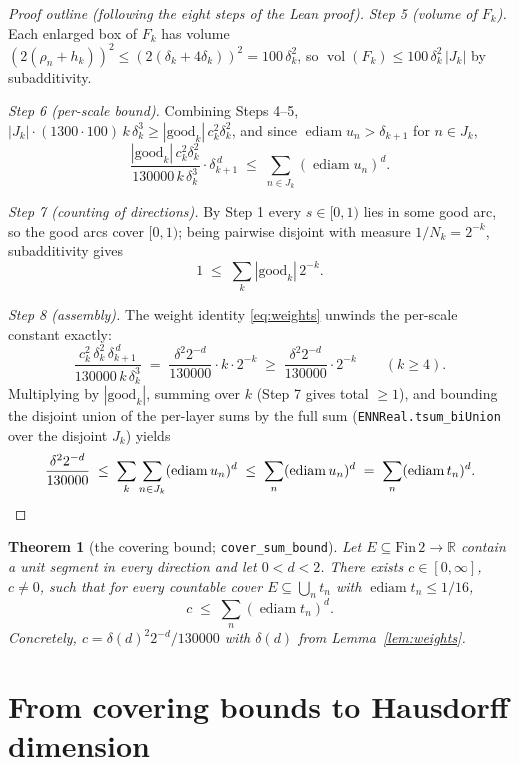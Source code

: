 \documentclass[11pt,a4paper]{article}
\newcommand{\R}{\mathbb{R}}
\newcommand{\ennr}{\ensuremath{[0,\infty]}}          %
\newcommand{\vol}{\operatorname{vol}}                %
\DeclareMathOperator{\ediam}{ediam}
\newcommand{\FinTwo}{\ensuremath{\mathrm{Fin}\,2 \to \R}}
\newcommand{\lname}[1]{\texttt{#1}}                  %
\newtheorem{theorem}{Theorem}[section]
\theoremstyle{definition}
\theoremstyle{remark}
\begin{document}
\begin{proof}[Proof outline (following the eight steps of the Lean proof)]
\medskip\noindent\emph{Step 5 (volume of $F_k$).}
Each enlarged box of $F_k$ has volume $(2(\rho_n+h_k))^2\le (2(\delta_k+4\delta_k))^2
=100\,\delta_k^2$, so
$\vol(F_k)\le 100\,\delta_k^2\,|J_k|$ by subadditivity.

\medskip\noindent\emph{Step 6 (per-scale bound).}
Combining Steps 4--5, $|J_k|\cdot (1300\cdot 100)\,k\,\delta_k^{3}\ge
|\mathrm{good}_k|\,c_k^{2}\delta_k^{2}$, and since
$\ediam u_n > \delta_{k+1}$ for $n\in J_k$,
\[
  \frac{|\mathrm{good}_k|\,c_k^{2}\delta_k^{2}}{130000\,k\,\delta_k^{3}}\cdot
  \delta_{k+1}^{\,d}
  \;\le\; \sum_{n\in J_k} (\ediam u_n)^{d} .
\]

\medskip\noindent\emph{Step 7 (counting of directions).}
By Step 1 every $s\in[0,1)$ lies in some good arc, so the good arcs cover $[0,1)$;
being pairwise disjoint with measure $1/N_k = 2^{-k}$, subadditivity gives
\[
  1\;\le\;\sum_k |\mathrm{good}_k|\,2^{-k}.
\]

\medskip\noindent\emph{Step 8 (assembly).}
The weight identity \eqref{eq:weights} unwinds the per-scale constant exactly:
\[
  \frac{c_k^{2}\,\delta_k^{2}\,\delta_{k+1}^{\,d}}{130000\,k\,\delta_k^{3}}
  \;=\; \frac{\delta^{2}2^{-d}}{130000}\cdot k\cdot 2^{-k}
  \;\ge\; \frac{\delta^{2}2^{-d}}{130000}\cdot 2^{-k} \qquad(k\ge4).
\]
Multiplying by $|\mathrm{good}_k|$, summing over $k$ (Step 7 gives total $\ge1$), and
bounding the disjoint union of the per-layer sums by the full sum
(\lname{ENNReal.tsum\_biUnion} over the disjoint $J_k$) yields
\[
  \frac{\delta^{2}2^{-d}}{130000}
  \;\le\; \sum_k\sum_{n\in J_k}(\ediam u_n)^{d}
  \;\le\; \sum_n (\ediam u_n)^{d}
  \;=\; \sum_n (\ediam t_n)^{d}. \qedhere
\]
\end{proof}

\begin{theorem}[{the covering bound; \lname{cover\_sum\_bound}}]
\label{thm:cover-sum-bound}
Let $E\subseteq\FinTwo$ contain a unit segment in every direction and let $0<d<2$.  There
exists $c\in\ennr$, $c\neq0$, such that for every countable cover
$E\subseteq\bigcup_n t_n$ with $\ediam t_n\le 1/16$,
\[
  c\;\le\;\sum_{n} (\ediam t_n)^{d}.
\]
Concretely, $c = \delta(d)^2 2^{-d}/130000$ with $\delta(d)$ from
Lemma~\ref{lem:weights}.
\end{theorem}

\section{From covering bounds to Hausdorff dimension}
\label{sec:transfer}
\end{document}
